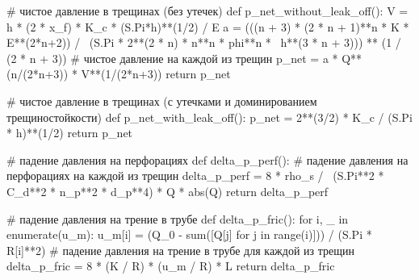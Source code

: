 \begin{pythoncode}
# чистое давление в трещинах (без утечек)
def p_net_without_leak_off():
    V = h * (2 * x_f) * K_c * (S.Pi*h)**(1/2) / E
    a = (((n + 3) * (2 * n + 1)**n * K * E**(2*n+2)) / \
         (S.Pi * 2**(2 * n) * n**n * phi**n * \
          h**(3 * n + 3))) ** (1 / (2 * n + 3))
    # чистое давление на каждой из трещин
    p_net = a * Q**(n/(2*n+3)) * V**(1/(2*n+3))
    return p_net

# чистое давление в трещинах (с утечками и доминированием трещиностойкости)
def p_net_with_leak_off():
    p_net = 2**(3/2) * K_c / (S.Pi * h)**(1/2)
    return p_net

# падение давления на перфорациях
def delta_p_perf():
    # падение давления на перфорациях на каждой из трещин
    delta_p_perf = 8 * rho_s / \
        (S.Pi**2 * C_d**2 * n_p**2 * d_p**4) * Q * abs(Q)
    return delta_p_perf

# падение давления на трение в трубе
def delta_p_fric():
    for i, _ in enumerate(u_m):
        u_m[i] = (Q_0 - sum([Q[j] for j in range(i)])) / (S.Pi * R[i]**2)
    # падение давления на трение в трубе для каждой из трещин
    delta_p_fric = 8 * (K / R) * (u_m / R) * L
    return delta_p_fric
\end{pythoncode}


